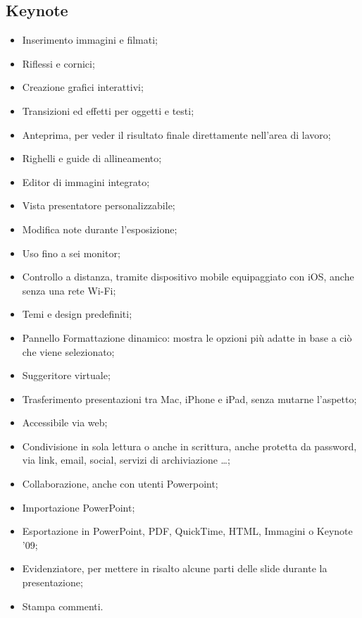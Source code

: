 \subsection{Keynote}
\begin{itemize}
  \item Inserimento immagini e filmati;
  \item Riflessi e cornici;
  \item Creazione grafici interattivi;
  \item Transizioni ed effetti per oggetti e testi;
  \item Anteprima, per veder il risultato finale direttamente nell’area di lavoro;
  \item Righelli e guide di allineamento;
  \item Editor di immagini integrato;
  \item Vista presentatore personalizzabile;
  \item Modifica note durante l'esposizione;
  \item Uso fino a sei monitor;
  \item Controllo a distanza, tramite dispositivo mobile equipaggiato con iOS, anche senza una rete Wi-Fi;
  \item Temi e design predefiniti;
  \item Pannello Formattazione dinamico: mostra le opzioni più adatte in base a ciò che viene selezionato;
  \item Suggeritore virtuale;
  \item Trasferimento presentazioni tra Mac, iPhone e iPad, senza mutarne l'aspetto;
  \item Accessibile via web;
  \item Condivisione in sola lettura o anche in scrittura, anche protetta da password, via link, email, social, servizi di archiviazione \dots;
  \item Collaborazione, anche con utenti Powerpoint;
  \item Importazione PowerPoint;
  \item Esportazione in PowerPoint, PDF, QuickTime, HTML, Immagini o Keynote ’09;
  \item Evidenziatore, per mettere in risalto alcune parti delle slide durante la presentazione;
  \item Stampa commenti.
\end{itemize}
